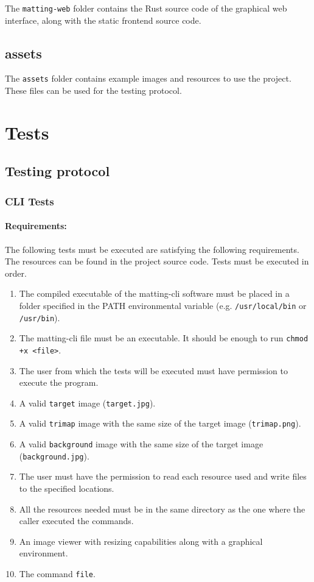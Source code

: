 \documentclass[a4paper]{article}
\begin{document}
The \texttt{matting-web} folder contains the Rust
source code of the graphical web interface,
along with the static frontend source code.

\subsection{assets}

The \texttt{assets} folder contains
example images and resources to use the project.
These files can be used for the testing protocol.

\pagebreak

\section{Tests}

\subsection{Testing protocol}

\subsubsection{CLI Tests}

\paragraph{Requirements:}
The following tests must be executed are satisfying the
following requirements. The resources can be found in the project source code.
Tests must be executed in order.

\begin{enumerate}
    \item The compiled executable of the matting-cli software
    must be placed in a folder specified in the \textsc{PATH}
    environmental variable (e.g. \texttt{/usr/local/bin} or \texttt{/usr/bin}).
    \item The matting-cli file must be an executable. It should be enough to run
    \lstinline{chmod +x <file>}.
    \item The user from which the tests will be executed must have permission to execute
    the program.
    \item A valid \texttt{target} image (\texttt{target.jpg}).
    \item A valid \texttt{\gls{trimap}} image with the same size of the target image (\texttt{trimap.png}).
    \item A valid \texttt{background} image with the same size of the target image (\texttt{background.jpg}).
    \item The user must have the permission to read each resource used and write files
    to the specified locations.
    \item All the resources needed must be in the same directory as the one where the caller executed the commands.
    \item An image viewer with resizing capabilities along with a graphical environment.
    \item The command \texttt{file}.
\end{enumerate}
\end{document}
